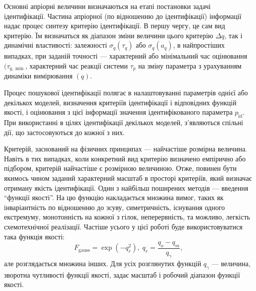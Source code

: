 \documentclass[a4paper,13pt]{atuaref}
\begin{document}

Основні апріорні величини визначаються на етапі постановки задачі
ідентифікації.
Частина апріорної (по відношенню до ідентифікації) інформації
надає процес синтезу критерію ідентифікації. В першу чергу, це сам вид
критерію. Їм визначаться як діапазон зміни величини цього критерію
$ \Delta q$, так і динамічні властивості: залежності
$ \sigma_q (\tau_q) $ або $\sigma_q(a_q) $,
в найпростіших випадках, при заданій точності --- характерний або
мінімальний час оцінювання $(\tau_{q, \min} $,
характерний час реакції
системи $ \tau_p $ на зміну параметра з урахуванням динаміки вимірювання $(q)$.

Процес пошукової ідентифікації полягає в налаштовуванні параметрів однієї або
декількох моделей, визначення критеріїв ідентифікації і відповідних функцій
якості, і оцінювання з цієї інформації значення ідентифікованого параметра
$ p_\mathrm{id}$. При використанні в цілях
ідентифікації декількох моделей, з'являються спільні дії, що застосовуються до
кожної з них.

Критерій, заснований на фізичних принципах --- найчастіше розмірна величина.
Навіть в тих випадках, коли конкретний вид критерію визначено емпірично або
підбором, критерій найчастіше є розмірною величиною.
Отже,
повинен бути якимось чином заданий характерний масштаб в просторі критеріїв,
який визначає отриману якість ідентифікації.
Один з найбільш поширених методів --- введення ``функції якості''.
На цю функцію накладається множина вимог, таких як
інваріантність по відношенню до зсуву, симетричність,
існування одного екстремуму, монотонність на кожної з гілок,
неперервність, та можливо, легкість схемотехнічної реалізації.
Частіше усього у цієї роботі буде використовуватися така функція якості:
\begin{equation}
  F_{\mathrm{gauss}} = \exp( - q_r^2 ),
  \;
  q_r = \frac{q_o - q_m}{q_\gamma},
\label{atu:eq:F_gauss}
\end{equation}
%
але розглядається множина інших.
Для усіх розглянутих функцій $ q_\gamma $ --- величина,
зворотна чутливості функції якості, задає масштаб і робочий діапазон функції якості.

\end{document}
